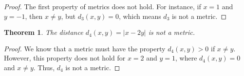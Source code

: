 \documentclass[psamsfonts]{amsart}
\newtheorem{thm}{Theorem}[section]
\theoremstyle{definition}
\theoremstyle{remark}
\numberwithin{equation}{section}
\begin{document}
\begin{proof}
The first property of metrics does not hold. For instance, if $x = 1$ and $y = -1$, then $x \neq y$, but $d_3(x,y) = 0$, which means $d_3$ is not a metric.
\end{proof}

\begin{thm}
The distance $d_4(x,y) = |x-2y|$ is not a metric.
\end{thm}

\begin{proof}
We know that a metric must have the property $d_4(x,y) > 0$ if $x \neq y$. However, this property does not hold for $x = 2$ and $y = 1$, where $d_4(x,y) = 0$ and $x \neq y$. Thus, $d_4$ is not a metric.
\end{proof}
\end{document}
